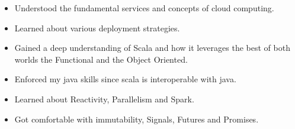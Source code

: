 \documentclass[10pt,a4paper,ragged2e,withhyper]{altacv}
\begin{document}
\begin{paracol}{2}

   \begin{itemize}
      \item Understood the fundamental services and concepts of cloud computing.
      \item Learned about various deployment strategies.
   \end{itemize}

   \divider


   \begin{itemize}
      \item Gained a deep understanding of Scala and how it leverages the best of both worlds the Functional and the Object Oriented.
      \item Enforced my java skills since scala is interoperable with java.
      \item Learned about Reactivity, Parallelism and Spark.
      \item Got comfortable with immutability, Signals, Futures and Promises.
   \end{itemize}







\end{paracol}
\end{document}
